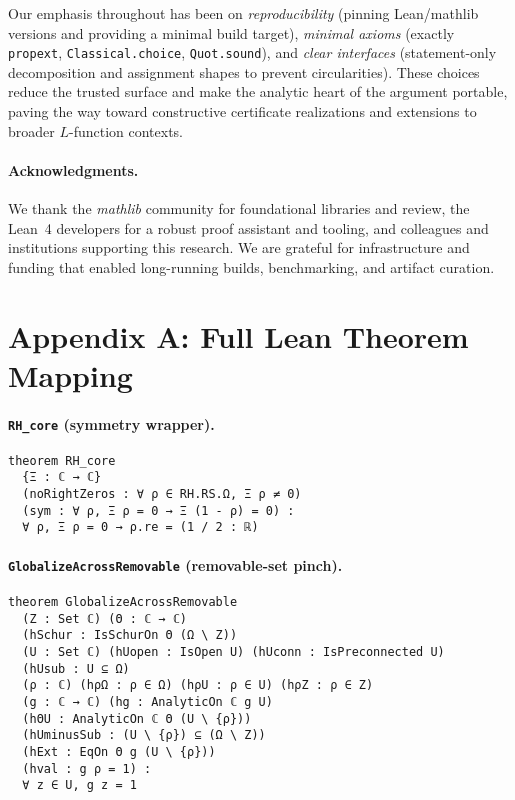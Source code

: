\documentclass[11pt]{article}
\theoremstyle{plain}
\theoremstyle{definition}
\begin{document}
Our emphasis throughout has been on \emph{reproducibility} (pinning Lean/mathlib versions and providing a minimal build target), \emph{minimal axioms} (exactly \texttt{propext}, \texttt{Classical.choice}, \texttt{Quot.sound}), and \emph{clear interfaces} (statement-only decomposition and assignment shapes to prevent circularities).
These choices reduce the trusted surface and make the analytic heart of the argument portable, paving the way toward constructive certificate realizations and extensions to broader \(L\)-function contexts.


\paragraph{Acknowledgments.}
We thank the \emph{mathlib} community for foundational libraries and review, the Lean~4 developers for a robust proof assistant and tooling, and colleagues and institutions supporting this research. We are grateful for infrastructure and funding that enabled long-running builds, benchmarking, and artifact curation.

\appendix

\section*{Appendix A: Full Lean Theorem Mapping}

\paragraph{\texttt{RH\_core} (symmetry wrapper).}
{\small
\begin{verbatim}
theorem RH_core
  {Ξ : ℂ → ℂ}
  (noRightZeros : ∀ ρ ∈ RH.RS.Ω, Ξ ρ ≠ 0)
  (sym : ∀ ρ, Ξ ρ = 0 → Ξ (1 - ρ) = 0) :
  ∀ ρ, Ξ ρ = 0 → ρ.re = (1 / 2 : ℝ)
\end{verbatim}
}

\paragraph{\texttt{GlobalizeAcrossRemovable} (removable-set pinch).}
{\small
\begin{verbatim}
theorem GlobalizeAcrossRemovable
  (Z : Set ℂ) (Θ : ℂ → ℂ)
  (hSchur : IsSchurOn Θ (Ω \ Z))
  (U : Set ℂ) (hUopen : IsOpen U) (hUconn : IsPreconnected U)
  (hUsub : U ⊆ Ω)
  (ρ : ℂ) (hρΩ : ρ ∈ Ω) (hρU : ρ ∈ U) (hρZ : ρ ∈ Z)
  (g : ℂ → ℂ) (hg : AnalyticOn ℂ g U)
  (hΘU : AnalyticOn ℂ Θ (U \ {ρ}))
  (hUminusSub : (U \ {ρ}) ⊆ (Ω \ Z))
  (hExt : EqOn Θ g (U \ {ρ}))
  (hval : g ρ = 1) :
  ∀ z ∈ U, g z = 1
\end{verbatim}
}
\end{document}
